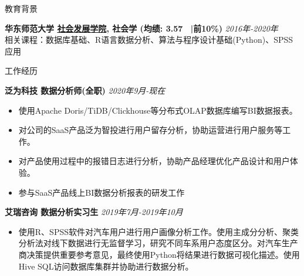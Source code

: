 \documentclass{resume} %
\begin{document}
\thispagestyle{empty}
\begin{rSection}{\noindent 教育背景}
\begin{spacing}{0.1} 
{\bf 华东师范大学 \href{http://www.soci.ecnu.edu.cn/}{社会发展学院}, 社会学  (均绩: 3.57 \ |前10\%)
} \hfill {\em 2016年-2020年} \\
相关课程：数据库基础、R语言数据分析、算法与程序设计基础(Python)、SPSS应用\\
\end{spacing}
\end{rSection} 

\begin{rSection}{\noindent 工作经历}
\begin{spacing}{0.5}  
{\bf 泛为科技 \quad 数据分析师(全职)} \hfill{\em 2020年9月-现在} 
\begin{itemize} 
\item 使用Apache Doris/TiDB/Clickhouse等分布式OLAP数据库编写BI数据报表。
\item 对公司的SaaS产品泛为智投进行用户留存分析，协助运营进行用户服务等工作。
\item 对产品使用过程中的报错日志进行分析，协助产品经理优化产品设计和用户体验。
\item 参与SaaS产品线上BI数据分析报表的研发工作
\end{itemize}
{\bf 艾瑞咨询 \quad 数据分析实习生} \hfill{\em 2019年7月-2019年10月} 
\begin{itemize}
 \item	使用R、SPSS软件对汽车用户进行用户画像分析工作。使用主成分分析、聚类分析法对线下数据进行无监督学习，研究不同车系用户态度区分。对汽车生产商决策提供重要参考意见，最终使用Python将结果进行数据可视化描述。使用Hive SQL访问数据库集群并协助进行数据分析。
\end{itemize}
\end{spacing}
\end{rSection}
\end{document}
